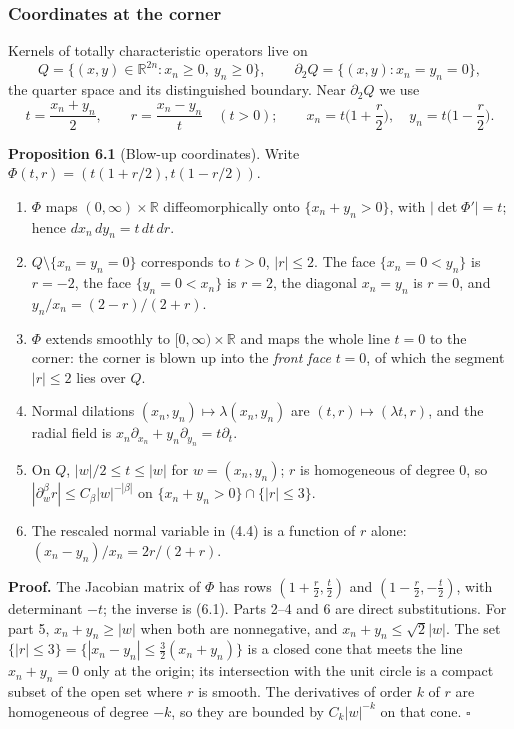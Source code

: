 \documentclass[
  11pt,
]{article}
\providecommand{\tightlist}{%
  \setlength{\itemsep}{0pt}\setlength{\parskip}{0pt}}
\begin{document}
\subsubsection{Coordinates at the
corner}\label{coordinates-at-the-corner}

Kernels of totally characteristic operators live on \[
Q=\{(x,y)\in\mathbb R^{2n}:x_n\geq0,\ y_n\geq0\},\qquad \partial_2Q=\{(x,y):x_n=y_n=0\},
\] the quarter space and its distinguished boundary. Near
\(\partial_2Q\) we use \[
t=\frac{x_n+y_n}2,\qquad r=\frac{x_n-y_n}t\quad(t>0);\qquad x_n=t\Big(1+\frac r2\Big),\quad y_n=t\Big(1-\frac r2\Big).
\tag{6.1}
\]

\textbf{Proposition 6.1} (Blow-up coordinates). Write
\(\Phi(t,r)=(t(1+r/2),t(1-r/2))\).

\begin{enumerate}
\def\labelenumi{\arabic{enumi}.}
\tightlist
\item
  \(\Phi\) maps \((0,\infty)\times\mathbb R\) diffeomorphically onto
  \(\{x_n+y_n>0\}\), with \(|\det\Phi'|=t\); hence
  \(dx_n\,dy_n=t\,dt\,dr\).
\item
  \(Q\setminus\{x_n=y_n=0\}\) corresponds to \(t>0\), \(|r|\leq2\). The
  face \(\{x_n=0<y_n\}\) is \(r=-2\), the face \(\{y_n=0<x_n\}\) is
  \(r=2\), the diagonal \(x_n=y_n\) is \(r=0\), and
  \(y_n/x_n=(2-r)/(2+r)\).
\item
  \(\Phi\) extends smoothly to \([0,\infty)\times\mathbb R\) and maps
  the whole line \(t=0\) to the corner: the corner is blown up into the
  \emph{front face} \(t=0\), of which the segment \(|r|\leq2\) lies over
  \(Q\).
\item
  Normal dilations \((x_n,y_n)\mapsto\lambda(x_n,y_n)\) are
  \((t,r)\mapsto(\lambda t,r)\), and the radial field is
  \(x_n\partial_{x_n}+y_n\partial_{y_n}=t\partial_t\).
\item
  On \(Q\), \(|w|/2\leq t\leq|w|\) for \(w=(x_n,y_n)\); \(r\) is
  homogeneous of degree 0, so
  \(|\partial_w^\beta r|\leq C_\beta|w|^{-|\beta|}\) on
  \(\{x_n+y_n>0\}\cap\{|r|\leq3\}\).
\item
  The rescaled normal variable in (4.4) is a function of \(r\) alone:
  \((x_n-y_n)/x_n=2r/(2+r)\).
\end{enumerate}

\textbf{Proof.} The Jacobian matrix of \(\Phi\) has rows
\((1+\tfrac r2,\tfrac t2)\) and \((1-\tfrac r2,-\tfrac t2)\), with
determinant \(-t\); the inverse is (6.1). Parts 2--4 and 6 are direct
substitutions. For part 5, \(x_n+y_n\geq|w|\) when both are nonnegative,
and \(x_n+y_n\leq\sqrt2|w|\). The set
\(\{|r|\leq3\}=\{|x_n-y_n|\leq\tfrac32(x_n+y_n)\}\) is a closed cone
that meets the line \(x_n+y_n=0\) only at the origin; its intersection
with the unit circle is a compact subset of the open set where \(r\) is
smooth. The derivatives of order \(k\) of \(r\) are homogeneous of
degree \(-k\), so they are bounded by \(C_k|w|^{-k}\) on that cone.
\(\square\)
\end{document}
